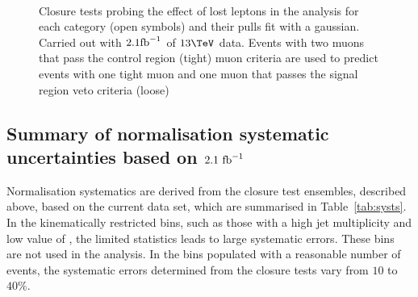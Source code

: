 \begin{figure}
  \begin{center}
    ~~
    \caption{Closure tests probing the effect of lost leptons in the
    analysis for each
    \njet category (open symbols) and their pulls fit with a gaussian.
    Carried out with $2.1\ifb$ of
      $13\tev$ data. Events with two muons that pass the control
      region (tight) muon criteria are used to predict events with one
      tight muon and one muon that passes the signal region veto
      criteria (loose)}
    \label{fig:closureLooseLep}
  \end{center} 
\end{figure}

\subsection{Summary of normalisation systematic uncertainties based on $2.1~\ifb$}
\label{sec:closure-test-syst}


Normalisation systematics are derived from the closure test ensembles,
described above, based on the current data set, which are summarised
in Table~\ref{tab:systs}. In the kinematically restricted bins, such
as those with a high jet multiplicity and low value of \scalht, the
limited statistics leads to large systematic errors. These bins are
not used in the analysis. 
In the bins populated with a reasonable number of events, the
systematic errors determined from the closure tests vary from $10$ to
$40\%$.

